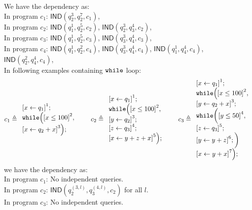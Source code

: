 \documentclass[a4paper,11pt]{article}
\begin{document}
We have the dependency as:
\\
In program $c_1$:
$\mathsf{IND}(q_2^3, q_2^7, c_1)$, 
\\
In program $c_2$:
$\mathsf{IND}(q_1^1, q_2^5, c_2)$,
$\mathsf{IND}(q_2^3, q_3^4, c_2)$,
\\
In program $c_3$:
$\mathsf{IND}(q_1^1, q_2^5, c_3)$,
$\mathsf{IND}(q_3^3, q_4^4, c_3)$,
\\
In program $c_4$:
$\mathsf{IND}(q_1^1, q_2^2, c_4)$,
$\mathsf{IND}(q_3^3, q_4^4, c_4)$,
$\mathsf{IND}(q_1^1, q_4^4, c_4)$,
$\mathsf{IND}(q_2^2, q_4^4, c_4)$,\\
In following examples containing $\mathtt{while}$ loop:
\[
c_1 \triangleq
\begin{array}{l}
     \left[x \leftarrow q_1 \right]^1 ; \\
    \ewhile \Big( 
    \left[x \leq 100 \right]^2 , \\
    \left[x \leftarrow q_2 + x \right]^3
    \Big) ;
\end{array}
%
\hspace{20pt}
%
c_2 \triangleq
\begin{array}{l}
     \left[x \leftarrow q_1 \right]^1 ; \\
    \ewhile \Big( 
    \left[x \leq 100 \right]^2 , \\
    \left[y \leftarrow q_2 \right]^3; \\
    \left[z \leftarrow q_3 \right]^4; \\
    \left[x \leftarrow y + z + x \right]^5
    \Big) ;
\end{array}
%
\hspace{20pt}
%
c_3 \triangleq
\begin{array}{l}
     \left[x \leftarrow q_1 \right]^1 ; \\
    \ewhile \Big( 
    \left[x \leq 100 \right]^2 , \\
    \left[y \leftarrow q_2 + x \right]^3; \\
    \ewhile \bigg( 
     \left[y \leq 50 \right]^4 , \\
    \left[z \leftarrow q_3 \right]^5; \\
    \left[y \leftarrow y + z \right]^6;
    \bigg)\\
    \left[x \leftarrow y + x \right]^7
    \Big) ;
\end{array}
%
\]
we have the dependency as:
\\
In program $c_1$: No independent queries.
\\
In program $c_2$: $\mathsf{IND}(q_2^{(3, l)}, q_3^{(4, l)}, c_2)$ for all $l$.
\\
In program $c_3$: No independent queries.
%
%
\end{document}
